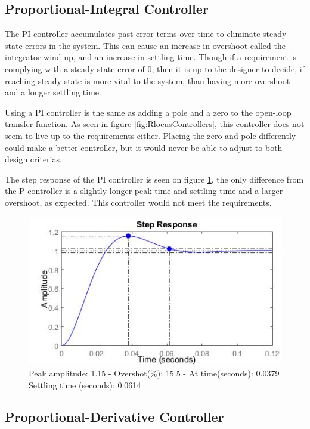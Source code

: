 \subsection{Proportional-Integral Controller}

The PI controller accumulates past error terms over time to eliminate steady-state errors in the system. This can cause an increase in overshoot called the integrator wind-up, and an increase in settling time. Though if a requirement is complying with a steady-state error of 0, then it is up to the designer to decide, if reaching steady-state is more vital to the system, than having more overshoot and a longer settling time.\par

Using a PI controller is the same as adding a pole and a zero to the open-loop transfer function. As seen in figure \ref{fig:RlocusControllers}, this controller does not seem to live up to the requirements either. Placing the zero and pole differently could make a better controller, but it would never be able to adjust to both design criterias.\par

The step response of the PI controller is seen on figure \ref{fig:PIStep}, the only difference from the P controller is a slightly longer peak time and settling time and a larger overshoot, as expected. This controller would not meet the requirements. 

\begin{figure}[h!]
\centering
\includegraphics[scale=0.7]{Billeder/PIStep.jpg}
\caption{ Peak amplitude: 1.15 - Overshot(\%): 15.5 - At time(seconds): 0.0379
		 Settling time (seconds): 0.0614 }
\label{fig:PIStep}
\end{figure}

\subsection{Proportional-Derivative Controller}

